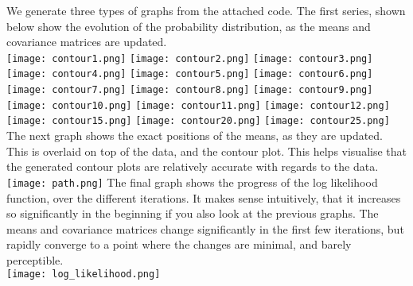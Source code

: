We generate three types of graphs from the attached code. The first series, shown below show the evolution of the probability distribution, as the means and covariance matrices are updated.\\
\texttt{[image: contour1.png]}
\texttt{[image: contour2.png]}
\texttt{[image: contour3.png]}
\texttt{[image: contour4.png]}
\texttt{[image: contour5.png]}
\texttt{[image: contour6.png]}
\texttt{[image: contour7.png]}
\texttt{[image: contour8.png]}
\texttt{[image: contour9.png]}
\texttt{[image: contour10.png]}
\texttt{[image: contour11.png]}
\texttt{[image: contour12.png]}
\texttt{[image: contour15.png]}
\texttt{[image: contour20.png]}
\texttt{[image: contour25.png]}
The next graph shows the exact positions of the means, as they are updated. This is overlaid on top of the data, and the contour plot. This helps visualise that the generated contour plots are relatively accurate with regards to the data.\\
\texttt{[image: path.png]}
The final graph shows the progress of the log likelihood function, over the different iterations. It makes sense intuitively, that it increases so significantly in the beginning if you also look at the previous graphs. The means and covariance matrices change significantly in the first few iterations, but rapidly converge to a point where the changes are minimal, and barely perceptible.\\
\texttt{[image: log\_likelihood.png]}
